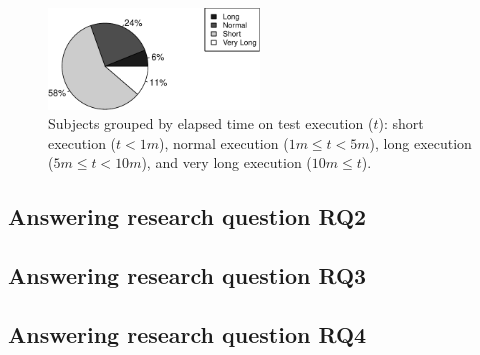 \begin{figure}[h!]
    \centering
    \includegraphics[width=0.5\textwidth]{results/rq1/plots/piechart.pdf}
    \caption{\label{fig:timecost-barplot} Subjects grouped by elapsed
    time on test execution ($t$): short execution ($t < 1m$), normal
    execution ($1m \leq t < 5m$), long execution ($5m \leq t <
    10m$), and very long execution ($10m \leq t$).}
\end{figure}



\subsection{Answering research question RQ2}
\label{sec:rqtwo}



\subsection{Answering research question RQ3}
\label{sec:rqthree}



\subsection{Answering research question RQ4}
\label{sec:rqfour}



